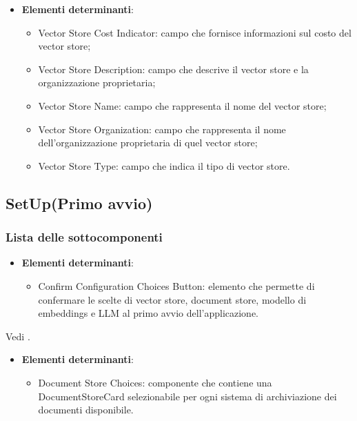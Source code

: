 \documentclass[10pt, a4paper]{article}
\begin{document}
\label{VectorStoreCardDettaglio}
\begin{itemize}
    \item \textbf{Elementi determinanti}:
     \begin{itemize}
        \item Vector Store Cost Indicator: campo che fornisce informazioni sul costo del vector store;
        \item Vector Store Description: campo che descrive il vector store e la organizzazione proprietaria;
        \item Vector Store Name: campo che rappresenta il nome del vector store;
        \item Vector Store Organization: campo che rappresenta il nome dell'organizzazione proprietaria di quel vector store;
        \item Vector Store Type: campo che indica il tipo di vector store.
    \end{itemize}
\end{itemize}



\subsection{SetUp(Primo avvio)}
\subsubsection{Lista delle sottocomponenti}

\label{ConfirmConfigurationDettaglio}
\begin{itemize}
    \item \textbf{Elementi determinanti}:
     \begin{itemize}
        \item Confirm Configuration Choices Button: elemento che permette di confermare le scelte di vector store, document store, modello di embeddings e LLM al primo avvio dell'applicazione.
    \end{itemize}
\end{itemize}


Vedi .

\label{DocumentStoreInitDettaglio}
\begin{itemize}
    \item \textbf{Elementi determinanti}:
     \begin{itemize}
        \item Document Store Choices: componente che contiene una DocumentStoreCard selezionabile per ogni sistema di archiviazione dei documenti disponibile.
    \end{itemize}
\end{itemize}
\end{document}

